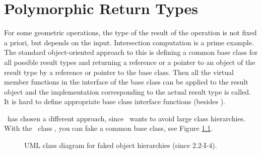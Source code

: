 
\chapter{Polymorphic Return Types}
%

For some geometric operations, the type of the result of the operation
is not fixed a priori, but depends on the input. Intersection computation
is a prime example. The standard object-oriented approach to this is defining
a common base class for all possible result types and returning a reference 
or a pointer to an object of the result type by a reference or pointer to the
base class. Then all the virtual member functions in the interface of 
the base class can be applied to the result object and the implementation
corresponding to the actual result type is called. It is hard to define
appropriate base class interface functions (besides ).

\cgal\ has chosen a different approach, since \cgal\ wants to avoid large
class hierarchies. With the \cgal\ 
class , you can fake a common
base class\ccIndexSubitem{base class}{faking}, see Figure \ref{Fig:Object}. 

\begin{figure}[h]
\caption{UML class diagram for faked object hierarchies (since 2.2-I-4).\label{Fig:Object}}
\end{figure}

